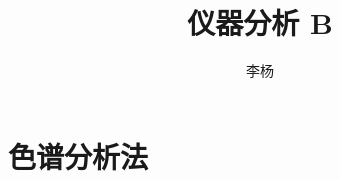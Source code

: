 \documentclass[a4paper]{ctexrep}
\title{仪器分析 B}
\author{李杨}
\begin{document}
\maketitle
\tableofcontents



\chapter{色谱分析法}
\end{document}
